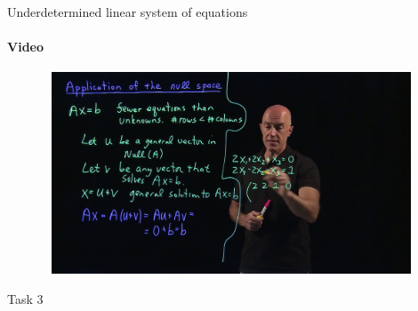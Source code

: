 \documentclass[aspectratio=169]{beamer}
\begin{document}
\begin{frame}[t]{Underdetermined linear system of equations}
    \framesubtitle{Video}
    \vspace{-0.6cm}
    \begin{figure}[H]
        \href{https://www.youtube.com/watch?v=g4CPb52ghJM&t=716s}{
            \centering\includegraphics[height=6cm,width=1\textwidth,keepaspectratio]{system_sol_preview.jpg}}
        \label{fig:system_sol_preview.jpg}
    \end{figure}
\end{frame}

\begin{frame}[t]{Task 3}
    \framesubtitle{}
\end{frame}
\end{document}
